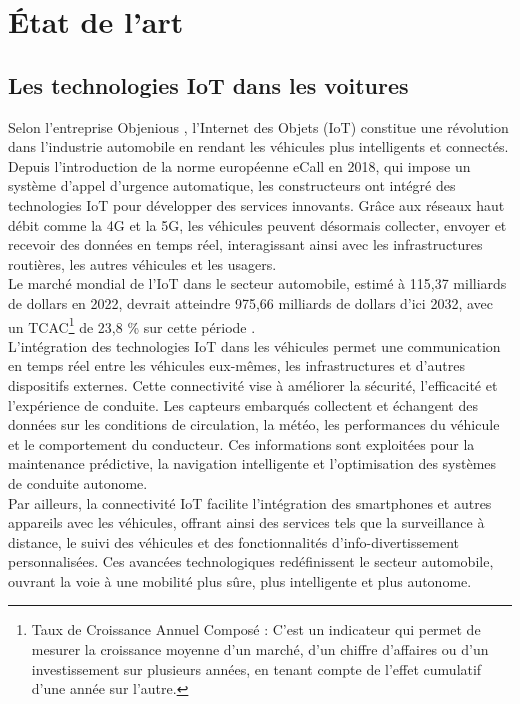 \section{État de l'art}


\subsection{Les technologies IoT dans les voitures}

Selon l’entreprise Objenious \cite{noauthor_revolution_2025}, l’Internet des Objets (IoT) constitue une révolution dans l’industrie automobile en rendant les véhicules plus intelligents et connectés. Depuis l’introduction de la norme européenne eCall en 2018, qui impose un système d’appel d’urgence automatique, les constructeurs ont intégré des technologies IoT pour développer des services innovants. Grâce aux réseaux haut débit comme la 4G et la 5G, les véhicules peuvent désormais collecter, envoyer et recevoir des données en temps réel, interagissant ainsi avec les infrastructures routières, les autres véhicules et les usagers.\\
Le marché mondial de l’IoT dans le secteur automobile, estimé à 115,37 milliards de dollars en 2022, devrait atteindre 975,66 milliards de dollars d’ici 2032, avec un TCAC\footnote{Taux de Croissance Annuel Composé : C’est un indicateur qui permet de mesurer la croissance moyenne d’un marché, d’un chiffre d’affaires ou d’un investissement sur plusieurs années, en tenant compte de l’effet cumulatif d’une année sur l’autre.} de 23,8 \% sur cette période \cite{noauthor_taille_2023}.\\
L’intégration des technologies IoT dans les véhicules permet une communication en temps réel entre les véhicules eux-mêmes, les infrastructures et d’autres dispositifs externes. Cette connectivité vise à améliorer la sécurité, l’efficacité et l’expérience de conduite. Les capteurs embarqués collectent et échangent des données sur les conditions de circulation, la météo, les performances du véhicule et le comportement du conducteur. Ces informations sont exploitées pour la maintenance prédictive, la navigation intelligente et l’optimisation des systèmes de conduite autonome.\\
Par ailleurs, la connectivité IoT facilite l’intégration des smartphones et autres appareils avec les véhicules, offrant ainsi des services tels que la surveillance à distance, le suivi des véhicules et des fonctionnalités d’info-divertissement personnalisées. Ces avancées technologiques redéfinissent le secteur automobile, ouvrant la voie à une mobilité plus sûre, plus intelligente et plus autonome.


